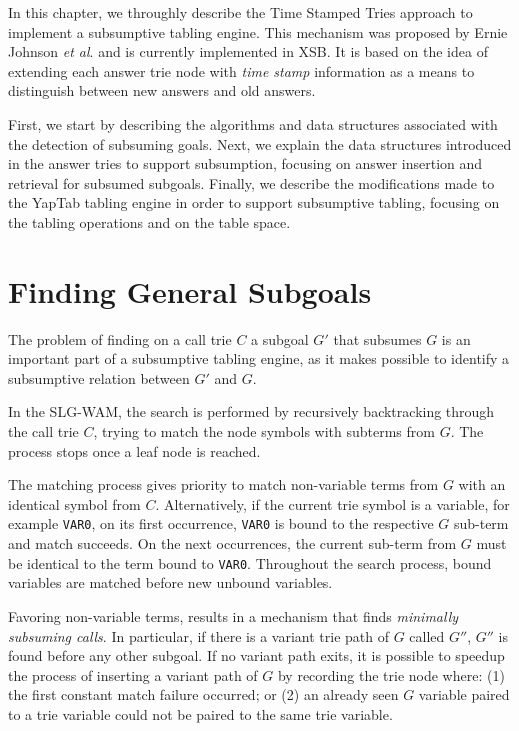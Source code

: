 In this chapter, we throughly describe the Time Stamped Tries approach
to implement a subsumptive tabling engine. This mechanism was proposed by
Ernie Johnson \textit{et al}. \cite{Johnson-99} and is currently implemented in XSB.
It is based on the idea of extending each answer trie node with \textit{time stamp}
information as a means to distinguish between new answers and old answers.

First, we start by describing the algorithms and data structures associated
with the detection of subsuming goals. Next, we explain the data structures
introduced in the answer tries to support subsumption, focusing on answer insertion
and retrieval for subsumed subgoals. Finally, we describe the modifications made to the YapTab
tabling engine in order to support subsumptive tabling, focusing on the tabling operations
and on the table space.

\section{Finding General Subgoals}\label{sec:lookup_subsuming}

The problem of finding on a call trie $C$ a subgoal $G'$ that subsumes $G$ 
is an important part of a subsumptive tabling engine, as it makes possible to
identify a subsumptive relation between $G'$ and $G$.

In the SLG-WAM, the search is performed by recursively backtracking through the call trie $C$, trying
to match the node symbols with subterms from $G$. The process stops once a leaf node is reached.

The matching process gives priority to match non-variable terms from $G$
with an identical symbol from $C$.
Alternatively, if the current trie symbol is a variable, for example \texttt{VAR0}, on its first occurrence, \texttt{VAR0}
is bound to the respective $G$ sub-term
and match succeeds. On the next occurrences, the current sub-term from $G$ must
be identical to the term bound to \texttt{VAR0}. Throughout the search process, bound variables are
matched before new unbound variables.

Favoring non-variable terms, results in a mechanism that finds \textit{minimally subsuming calls}.
In particular, if there is a variant trie path of $G$ called $G''$, $G''$ is found before any other subgoal.
If no variant path exits, it is possible to speedup the process of inserting a variant path of $G$
by recording the trie node where: (1) the first constant match
failure occurred; or (2) an already seen $G$ variable paired to a trie variable could
not be paired to the same trie variable.

